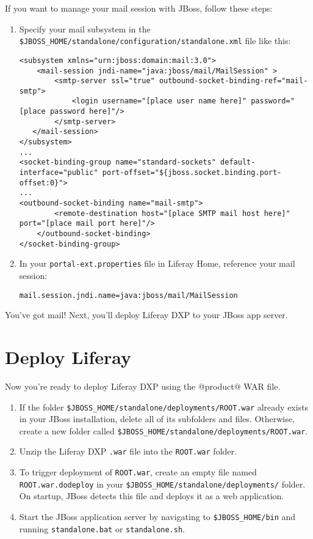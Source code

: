If you want to manage your mail session with JBoss, follow these steps:

\begin{enumerate}
\def\labelenumi{\arabic{enumi}.}
\item
  Specify your mail subsystem in the
  \texttt{\$JBOSS\_HOME/standalone/configuration/standalone.xml} file
  like this:

\begin{verbatim}
<subsystem xmlns="urn:jboss:domain:mail:3.0">
    <mail-session jndi-name="java:jboss/mail/MailSession" >
        <smtp-server ssl="true" outbound-socket-binding-ref="mail-smtp">
            <login username="[place user name here]" password="[place password here]"/>
        </smtp-server>
   </mail-session>
</subsystem>
...
<socket-binding-group name="standard-sockets" default-interface="public" port-offset="${jboss.socket.binding.port-offset:0}">
...
<outbound-socket-binding name="mail-smtp">
        <remote-destination host="[place SMTP mail host here]" port="[place mail port here]"/>
    </outbound-socket-binding>
</socket-binding-group>
\end{verbatim}
\item
  In your \texttt{portal-ext.properties} file in Liferay Home, reference
  your mail session:

\begin{verbatim}
mail.session.jndi.name=java:jboss/mail/MailSession
\end{verbatim}
\end{enumerate}

You've got mail! Next, you'll deploy Liferay DXP to your JBoss app
server.

\section{Deploy Liferay}\label{deploy-liferay}

Now you're ready to deploy Liferay DXP using the @product@ WAR file.

\begin{enumerate}
\def\labelenumi{\arabic{enumi}.}
\item
  If the folder \texttt{\$JBOSS\_HOME/standalone/deployments/ROOT.war}
  already exists in your JBoss installation, delete all of its
  subfolders and files. Otherwise, create a new folder called
  \texttt{\$JBOSS\_HOME/standalone/deployments/ROOT.war}.
\item
  Unzip the Liferay DXP \texttt{.war} file into the \texttt{ROOT.war}
  folder.
\item
  To trigger deployment of \texttt{ROOT.war}, create an empty file named
  \texttt{ROOT.war.dodeploy} in your
  \texttt{\$JBOSS\_HOME/standalone/deployments/} folder. On startup,
  JBoss detects this file and deploys it as a web application.
\item
  Start the JBoss application server by navigating to
  \texttt{\$JBOSS\_HOME/bin} and running \texttt{standalone.bat} or
  \texttt{standalone.sh}.
\end{enumerate}

